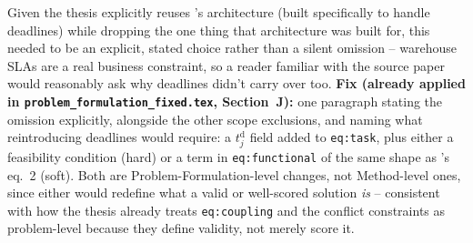 \documentclass[11pt]{article}
\begin{document}
Given the thesis explicitly reuses \citeauthor{knippenberg2021}'s
architecture (built specifically to handle deadlines) while dropping the one
thing that architecture was built for, this needed to be an explicit,
stated choice rather than a silent omission -- warehouse SLAs are a real
business constraint, so a reader familiar with the source paper would
reasonably ask why deadlines didn't carry over too. \textbf{Fix (already
applied in \texttt{problem\_formulation\_fixed.tex}, Section~J):} one
paragraph stating the omission explicitly, alongside the other scope
exclusions, and naming what reintroducing deadlines would require: a
$t_j^{\mathrm{d}}$ field added to \texttt{eq:task}, plus either a feasibility
condition (hard) or a term in \texttt{eq:functional} of the same shape as
\citeauthor{knippenberg2021}'s eq.~2 (soft). Both are Problem-Formulation-level
changes, not Method-level ones, since either would redefine what a valid or
well-scored solution \emph{is} -- consistent with how the thesis already
treats \texttt{eq:coupling} and the conflict constraints as problem-level
because they define validity, not merely score it.
\end{document}
